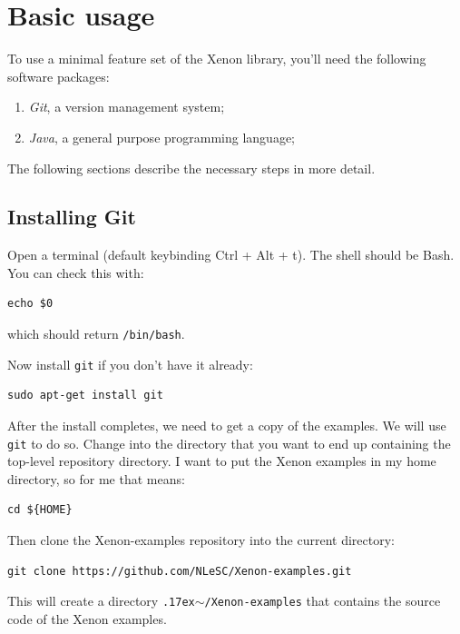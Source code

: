 \documentclass[12pt, a4paper, twoside, openany, titlepage]{book}
\newcommand{\mytilde}{\raise.17ex\hbox{$\scriptstyle\sim$}}
\begin{document}
\chapter{Basic usage}

To use a minimal feature set of the Xenon library, you'll need the following software packages:
\begin{enumerate}
\item{\textit{Git}, a version management system;}
\item{\textit{Java}, a general purpose programming language;}
\end{enumerate}


The following sections describe the necessary steps in more detail.




\section{Installing Git}

Open a terminal (default keybinding Ctrl + Alt + t). The shell should be Bash. You can check this with:
\begin{lstlisting}[style=basic,style=bash]
echo $0
\end{lstlisting} %
which should return \texttt{/bin/bash}.


Now install \texttt{git} if you don't have it already:
\begin{lstlisting}[style=basic,style=bash]
sudo apt-get install git
\end{lstlisting}

After the install completes, we need to get a copy of the examples. We will use \texttt{git} to do so. Change into the directory that you want to end up containing the top-level repository directory. I want to put the Xenon examples in my home directory, so for me that means:
\begin{lstlisting}[style=basic,style=bash]
cd ${HOME}
\end{lstlisting} %

Then clone the Xenon-examples repository into the current directory:
\begin{lstlisting}[style=basic,style=bash]
git clone https://github.com/NLeSC/Xenon-examples.git
\end{lstlisting}
This will create a directory \texttt{\mytilde{}/Xenon-examples} that contains the source code of the Xenon examples.
\end{document}
